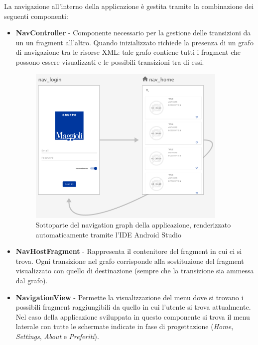 La navigazione all'interno della applicazione è gestita tramite la combinazione dei seguenti componenti:
\begin{itemize}
    \item \textbf{NavController} - Componente necessario per la gestione delle transizioni da un un fragment all'altro. Quando inizializzato richiede la presenza di un grafo di navigazione tra le risorse XML: tale grafo contiene tutti i fragment che possono essere visualizzati e le possibili transizioni tra di essi.

    \begin{figure}[H]
        \centering
        \includegraphics[width=0.9\textwidth]{img/android-nav-graph.png}
        \caption{Sottoparte del navigation graph della applicazione, renderizzato automaticamente tramite l'IDE Android Studio}
        \label{android-nav-graph-png}
    \end{figure}
    
    \item \textbf{NavHostFragment} - Rappresenta il contenitore del fragment in cui ci si trova. Ogni transizione nel grafo corrisponde alla sostituzione del fragment visualizzato con quello di destinazione (sempre che la transizione sia ammessa dal grafo).
    \item \textbf{NavigationView} - Permette la visualizzazione del menu dove si trovano i possibili fragment raggiungibili da quello in cui l'utente si trova attualmente. Nel caso della applicazione sviluppata in questo componente si trova il menu laterale con tutte le schermate indicate in fase di progettazione (\textit{Home}, \textit{Settings}, \textit{About} e \textit{Preferiti}).
\end{itemize}

